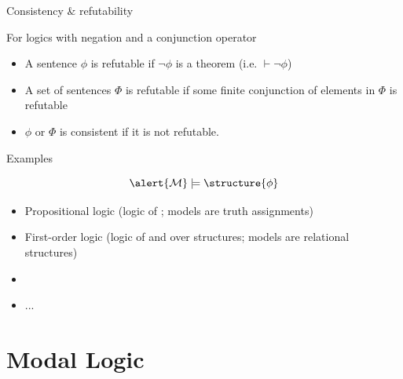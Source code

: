 \documentclass[aspectratio=169]{beamer}
\begin{document}
\begin{slide}{Consistency \& refutability}\label{s:5}
\small

For logics with \alert{negation} and a \alert{conjunction} operator

\begin{itemize}
\item A sentence $\phi$ is \alert{refutable} if $\neg \phi$ is a theorem (i.e. $\vdash \neg \phi$)
\item A set of sentences $\Phi$ is \alert{refutable} if some finite conjunction of elements in $\Phi$ is refutable
\item $\phi$ or $\Phi$ is \alert{consistent} if it is not refutable.
\end{itemize}

\end{slide}

\begin{slide}{Examples}\label{s:6}
\small

$$ \alert{\ger{M}} \models \structure{\phi} $$

\begin{itemize}
\item Propositional logic (logic of ; models are \alert{truth assignments})
\item First-order logic (logic of  and  over structures; models are \alert{relational structures})
\item {}
\item ...
\end{itemize}

\end{slide}

\section{Modal Logic}
\end{document}
